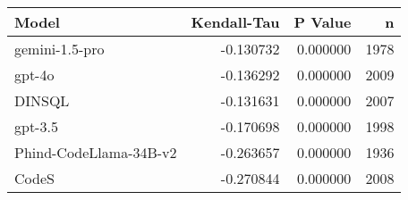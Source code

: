 \begin{tabular}{lrrr}
\toprule
Model & Kendall-Tau & P Value & n \\
\midrule
gemini-1.5-pro & -0.130732 & 0.000000 & 1978 \\
gpt-4o & -0.136292 & 0.000000 & 2009 \\
DINSQL & -0.131631 & 0.000000 & 2007 \\
gpt-3.5 & -0.170698 & 0.000000 & 1998 \\
Phind-CodeLlama-34B-v2 & -0.263657 & 0.000000 & 1936 \\
CodeS & -0.270844 & 0.000000 & 2008 \\
\bottomrule
\end{tabular}
